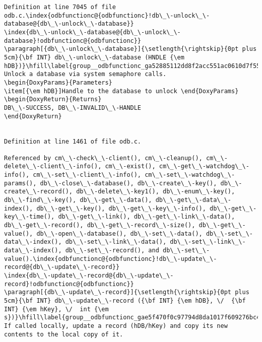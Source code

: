 \begin{DoxyItemize}
\begin{DoxyCode}
\begin{verbatim}
Definition at line 7045 of file odb.c.\index{odbfunctionc@{odbfunctionc}!db\_\-unlock\_\-database@{db\_\-unlock\_\-database}}
\index{db\_\-unlock\_\-database@{db\_\-unlock\_\-database}!odbfunctionc@{odbfunctionc}}
\paragraph[{db\_\-unlock\_\-database}]{\setlength{\rightskip}{0pt plus 5cm}{\bf INT} db\_\-unlock\_\-database (HNDLE {\em hDB})}\hfill\label{group__odbfunctionc_ga52885112dd8f2acc551ac0610d7f552d}
Unlock a database via system semaphore calls. 
\begin{DoxyParams}{Parameters}
\item[{\em hDB}]Handle to the database to unlock \end{DoxyParams}
\begin{DoxyReturn}{Returns}
DB\_\-SUCCESS, DB\_\-INVALID\_\-HANDLE 
\end{DoxyReturn}


Definition at line 1461 of file odb.c.

Referenced by cm\_\-check\_\-client(), cm\_\-cleanup(), cm\_\-delete\_\-client\_\-info(), cm\_\-exist(), cm\_\-get\_\-watchdog\_\-info(), cm\_\-set\_\-client\_\-info(), cm\_\-set\_\-watchdog\_\-params(), db\_\-close\_\-database(), db\_\-create\_\-key(), db\_\-create\_\-record(), db\_\-delete\_\-key1(), db\_\-enum\_\-key(), db\_\-find\_\-key(), db\_\-get\_\-data(), db\_\-get\_\-data\_\-index(), db\_\-get\_\-key(), db\_\-get\_\-key\_\-info(), db\_\-get\_\-key\_\-time(), db\_\-get\_\-link(), db\_\-get\_\-link\_\-data(), db\_\-get\_\-record(), db\_\-get\_\-record\_\-size(), db\_\-get\_\-value(), db\_\-open\_\-database(), db\_\-set\_\-data(), db\_\-set\_\-data\_\-index(), db\_\-set\_\-link\_\-data(), db\_\-set\_\-link\_\-data\_\-index(), db\_\-set\_\-record(), and db\_\-set\_\-value().\index{odbfunctionc@{odbfunctionc}!db\_\-update\_\-record@{db\_\-update\_\-record}}
\index{db\_\-update\_\-record@{db\_\-update\_\-record}!odbfunctionc@{odbfunctionc}}
\paragraph[{db\_\-update\_\-record}]{\setlength{\rightskip}{0pt plus 5cm}{\bf INT} db\_\-update\_\-record ({\bf INT} {\em hDB}, \/  {\bf INT} {\em hKey}, \/  int {\em s})}\hfill\label{group__odbfunctionc_gae5f470f0c97794d8da1017f609276bc4}
If called locally, update a record (hDB/hKey) and copy its new contents to the local copy of it.


\end{verbatim}
\end{DoxyCode}
\end{DoxyItemize}
